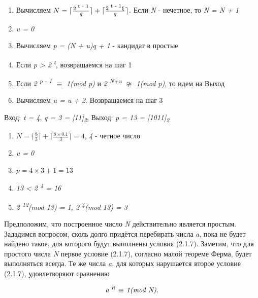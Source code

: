       \begin{enumerate}
      \item Вычисляем \textit{{$N = \lceil \frac{2\textsuperscript{ t - 1}}{q} \rceil + \lceil \frac{2\textsuperscript{ t - 1} \xi}{q} \rceil$}}. 
      Если \textit{N} - нечетное, то \textit{N = N + 1}
      \item \textit{u = 0}
      \item Вычисляем \textit{p = (N + u)q + 1} - кандидат в простые
      \item Если \textit{p > 2\textsuperscript{ t}}, возвращаемся на шаг 1
      \item Если \textit{2\textsuperscript{ p - 1} {$\equiv$} 1(mod p)} и \textit{2\textsuperscript{ N+u} {$\ncong$} 1(mod p)}, то идем на Выход
      \item Вычисляем \textit{u = u + 2}. Возвращаемся на шаг 3
      \end{enumerate}
      
      \begin{example}
	Вход: \textit{t = 4}, \textit{q = 3 = [11]\textsubscript{2}}, Выход: \textit{p = 13 = [1011]\textsubscript{2}}
	
	  \begin{enumerate}
	   \item \textit{{$N = \lceil \frac{8}{3} \rceil + \lceil \frac{8 \times 0.1}{3} \rceil = 4$}}, \textit{4} - четное число
	   \item \textit{u = 0}
	   \item \textit{{$p = 4 \times 3 + 1 = 13$}}
	   \item \textit{13 < 2\textsuperscript{ 4} = 16}
	   \item \textit{2\textsuperscript{ 12}(mod 13) = 1, 2\textsuperscript{ 4}(mod 13) = 3}
	  \end{enumerate}  
	
      \end{example}


  Предположим, что построенное число \textit{N} действительно является простым. Зададимся вопросом, сколь долго придётся 
перебирать числа \textit{a}, пока не будет найдено такое, для которого будут выполнены условия (2.1.7). Заметим, что для простого числа \textit{N}
первое условие (2.1.7), согласно малой теореме Ферма, будет выполняться всегда. Те же числа \textit{a}, для которых нарушается второе 
условие (2.1.7), удовлетворяют сравнению

  \begin{equation}
   \textit{a\textsuperscript{ R} {$\equiv$} 1(mod N)}.
  \end{equation}

